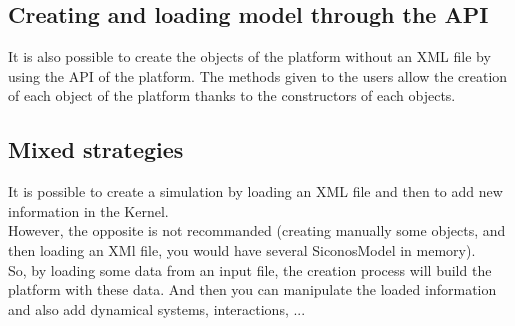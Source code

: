 \subsection{Creating and loading model through the API}
It is also  possible to create the objects of the platform without an XML file by using the API of the platform. The methods given to the users allow the creation of each object of the platform thanks to the constructors of each objects.

\subsection{Mixed strategies}
\label{mixed strategies}
It is possible to create a simulation by loading an XML file and then to add new information in the Kernel.\\
However, the opposite is not recommanded (creating manually some objects, and then loading an XMl file, you would have several SiconosModel in memory).\\
So, by loading some data from an input file, the creation process will build the platform with these data. And then you can manipulate the loaded information and also add dynamical systems, interactions, ...







